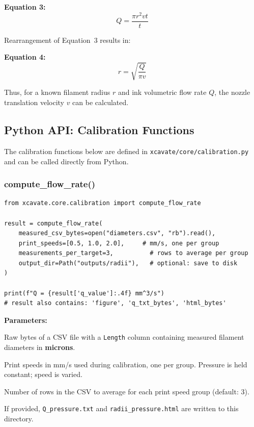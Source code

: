 \documentclass[11pt,letterpaper]{article}
\newcommand{\code}[1]{\texttt{#1}}
\begin{document}
\textbf{Equation 3:}
\begin{equation}
Q = \frac{\pi r^2 v t}{t}
\end{equation}

Rearrangement of Equation~3 results in:

\textbf{Equation 4:}
\begin{equation}
r = \sqrt{\frac{Q}{\pi v}}
\end{equation}

Thus, for a known filament radius $r$ and ink volumetric flow rate $Q$, the
nozzle translation velocity $v$ can be calculated.

\subsection{Python API: Calibration Functions}

\begin{claudebox}
The calibration functions below are defined in
\code{xcavate/core/calibration.py} and can be called directly from Python.
\end{claudebox}

\subsubsection{compute\_flow\_rate()}

\begin{lstlisting}[style=python]
from xcavate.core.calibration import compute_flow_rate

result = compute_flow_rate(
    measured_csv_bytes=open("diameters.csv", "rb").read(),
    print_speeds=[0.5, 1.0, 2.0],     # mm/s, one per group
    measurements_per_target=3,          # rows to average per group
    output_dir=Path("outputs/radii"),   # optional: save to disk
)

print(f"Q = {result['q_value']:.4f} mm^3/s")
# result also contains: 'figure', 'q_txt_bytes', 'html_bytes'
\end{lstlisting}

\textbf{Parameters:}
\begin{description}[leftmargin=2cm]
    \item[\code{measured\_csv\_bytes}] Raw bytes of a CSV file with a
    \code{Length} column containing measured filament diameters in
    \textbf{microns}.
    \item[\code{print\_speeds}] Print speeds in mm/s used during calibration,
    one per group. Pressure is held constant; speed is varied.
    \item[\code{measurements\_per\_target}] Number of rows in the CSV to
    average for each print speed group (default: 3).
    \item[\code{output\_dir}] If provided, \code{Q\_pressure.txt} and
    \code{radii\_pressure.html} are written to this directory.
\end{description}
\end{document}
